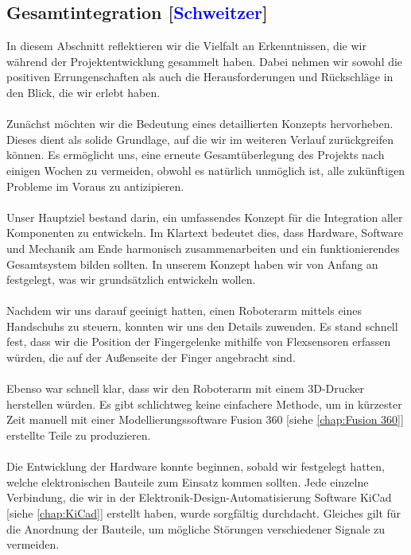 \documentclass[titlepage,12pt,twoside]{article}
\begin{document}
\subsection{Gesamtintegration [\textcolor{blue}{Schweitzer}]}
In diesem Abschnitt reflektieren wir die Vielfalt an Erkenntnissen, die wir 
während der Projektentwicklung gesammelt haben. Dabei nehmen wir sowohl die 
positiven Errungenschaften als auch die Herausforderungen und Rückschläge in 
den Blick, die wir erlebt haben. \\
\\
Zunächst möchten wir die Bedeutung eines detaillierten Konzepts hervorheben. 
Dieses dient als solide Grundlage, auf die wir im weiteren Verlauf zurückgreifen 
können. Es ermöglicht uns, eine erneute Gesamtüberlegung des Projekts nach 
einigen Wochen zu vermeiden, obwohl es natürlich unmöglich ist, alle zukünftigen 
Probleme im Voraus zu antizipieren. \\
\\
Unser Hauptziel bestand darin, ein umfassendes Konzept für die Integration 
aller Komponenten zu entwickeln. Im Klartext bedeutet dies, dass Hardware, 
Software und Mechanik am Ende harmonisch zusammenarbeiten und ein funktionierendes 
Gesamtsystem bilden sollten. In unserem Konzept haben wir von Anfang an 
festgelegt, was wir grundsätzlich entwickeln wollen. \\
\\
Nachdem wir uns darauf geeinigt hatten, einen Roboterarm mittels eines 
Handschuhs zu steuern, konnten wir uns den Details zuwenden. Es stand schnell 
fest, dass wir die Position der Fingergelenke mithilfe von Flexsensoren 
erfassen würden, die auf der Außenseite der Finger angebracht sind. \\
\\
Ebenso war schnell klar, dass wir den Roboterarm mit einem 3D-Drucker 
herstellen würden. Es gibt schlichtweg keine einfachere Methode, um in 
kürzester Zeit manuell mit einer Modellierungssoftware Fusion 360 [siehe \textcolor{blue}{\autoref{chap:Fusion 360}}] erstellte 
Teile zu produzieren. \\
\\
Die Entwicklung der Hardware konnte beginnen, sobald wir festgelegt hatten, 
welche elektronischen Bauteile zum Einsatz kommen sollten. Jede einzelne 
Verbindung, die wir in der Elektronik-Design-Automatisierung Software KiCad [siehe \textcolor{blue}{\autoref{chap:KiCad}}]
erstellt haben, wurde sorgfältig durchdacht. Gleiches gilt für die Anordnung 
der Bauteile, um mögliche Störungen verschiedener Signale zu vermeiden. \\
\end{document}
